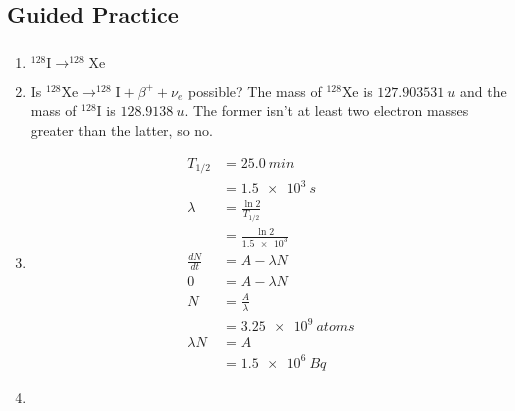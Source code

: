 \documentclass{article}
\begin{document}
\subsection{Guided Practice}

\subsubsection{}

\begin{enumerate}
  \item $^{128} \text{I} \rightarrow ^{128} \text{Xe}$

  \item Is $^{128} \text{Xe} \rightarrow ^{128} \text{I} + \beta^+ + \nu_e$ possible? The mass of $^{128} \text{Xe}$ is $\qty{127.903531}{u}$ and the mass of $^{128} \text{I}$ is $\qty{128.9138}{u}$. The former isn't at least two electron masses greater than the latter, so no.

  \item

        \begin{align*}
          T_{1 / 2}       & = \qty{25.0}{min}           \\
                          & = \qty{1.5e3}{s}            \\
          \lambda         & = \frac{\ln 2}{T_{1 / 2}}   \\
                          & = \frac{\ln 2}{\num{1.5e3}} \\
          \frac{d N}{d t} & = A - \lambda N             \\
          0               & = A - \lambda N             \\
          N               & = \frac{A}{\lambda}         \\
                          & = \qty{3.25e9}{atoms}       \\
          \lambda N       & = A                         \\
                          & = \qty{1.5e6}{Bq}
        \end{align*}

  \item


\end{enumerate}
\end{document}
